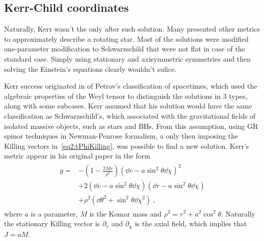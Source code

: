 \subsection{Kerr-Child coordinates}

Naturally, Kerr wasn't the only after such solution.
Many presented other metrics to approximately describe a rotating star. 
Most of the solutions were modified one-parameter modification to Schwarzschild that were not flat in case of the standard case. 
Simply using stationary and axisymmetric symmetries and then solving the Einstein's equations clearly wouldn't sufice.

Kerr success originated in of Petrov's classification of spacetimes, which used the algebraic properties of the Weyl tensor to distinguish the solutions in 3 types, along with some subcases.
Kerr assumed that his solution would have the same classification as Schwarzschild's, which associated with the gravitational fields of isolated massive objects, such as stars and BHs. 
From this assumption, using GR spinor techniques in Newman-Penrose formalism, a only then imposing the Killing vectors in~\eqref{eq2:tPhiKilling}, was possible to find a new solution. Kerr's metric appear in his original paper in the form
\begin{align}
    \begin{split}
        g = &- \left(1 - \frac{2 M r}{\rho^2} \right) (\dd v - a \sin^2\theta \dd \chi )^2 \\
        &+ 2  (\dd v - a \sin^2\theta \dd \chi )  (\dd r - a \sin^2\theta \dd \chi ) \\
        &+ \rho^2 (\dd \theta^2 + \sin^2\theta \dd \chi^2 ) ~,
    \end{split}
    \label{eq2:KerrIngoingEF}
\end{align}
where $a$ is a parameter, $M$ is the Komar mass and $\rho^2 = r^2 + a^2 \cos^2\theta$. Naturally the stationary Killing vector is $\partial_v$ and $\partial_\chi$ is the axial field, which implies that $J = a M$.

